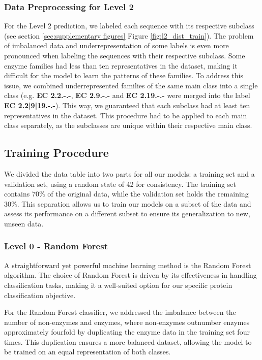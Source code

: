 \documentclass{bioinfo}
\begin{document}
\begin{methods}
\subsubsection{Data Preprocessing for Level 2}
For the Level 2 prediction, we labeled each sequence with its respective subclass (see section \ref{sec:supplementary figures} Figure \ref{fig:l2_dist_train}).
The problem of imbalanced data and underrepresentation of some labels is even more pronounced when labeling the sequences with their respective subclass.
Some enzyme families had less than ten representatives in the dataset, making it difficult for the model to learn the patterns of these families.
To address this issue, we combined underrepresented families of the same main class into a single class 
(e.g. \textbf{EC 2.2.-.-}, \textbf{EC 2.9.-.-} and \textbf{EC 2.19.-.-} were merged into the label \textbf{EC 2.2|9|19.-.-}).
This way, we guaranteed that each subclass had at least ten representatives in the dataset.
This procedure had to be applied to each main class separately, as the subclasses are unique within their respective main class.

\subsection{Training Procedure}
We divided the data table into two parts for all our models: a training set and a validation set, using a random state of 42 for consistency. 
The training set contains $70\%$ of the original data, while the validation set holds the remaining $30\%$. 
This separation allows us to train our models on a subset of the data and assess its performance on a different subset to ensure its generalization to new, unseen data.

\subsubsection{Level 0 - Random Forest}
A straightforward yet powerful machine learning method is the Random
Forest algorithm. The choice of Random Forest is driven by its
effectiveness in handling classification tasks, making it a well-suited
option for our specific protein classification objective. 

For the Random Forest classifier, we addressed the imbalance between the number of non-enzymes and enzymes, 
where non-enzymes outnumber enzymes approximately
fourfold by duplicating the enzyme data in the training set four times.
This duplication ensures a more balanced dataset, allowing the model to
be trained on an equal representation of both classes.


\end{methods}
\end{document}
